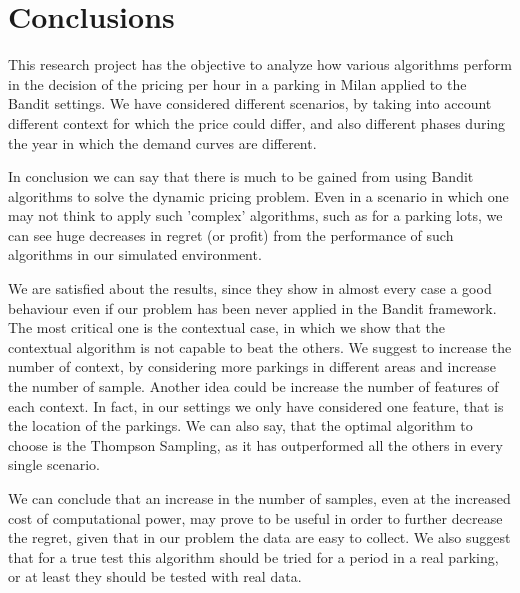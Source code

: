\newpage
\section{Conclusions}\label{sec:conclusions}

This research project has the objective to analyze how various algorithms perform in the decision of the pricing
per hour in a parking in Milan applied to the Bandit settings. We have considered different scenarios, by taking into
account different context for which the price could differ, and also different phases during the year in which the demand
curves are different.

In conclusion we can say that there is much to be gained from using Bandit algorithms to solve the dynamic pricing problem.
Even in a scenario in which one may not think to apply such 'complex' algorithms, such as for a parking lots, we can see
huge decreases in regret (or profit) from the performance of such algorithms in our simulated environment.

We are satisfied about the results, since they show in almost every case a good behaviour even if our problem has been never
applied in the Bandit framework. The most critical one is the contextual case, in which we show that the contextual algorithm
is not capable to beat the others. We suggest to increase the number of context, by considering more parkings in different areas
and increase the number of sample. Another idea could be increase the number of features of each context. In fact, in our settings
we only have considered one feature, that is the location of the parkings.
We can also say, that the optimal algorithm to choose is the Thompson Sampling, as it has outperformed all the others
in every single scenario.

We can conclude that an increase in the number of samples, even at the increased cost of computational power,
may prove to be useful in order to further decrease the regret, given that in our problem the data are easy to collect.
We also suggest that for a true test this algorithm should be tried for a period in a real parking, or at least they
should be tested with real data.
